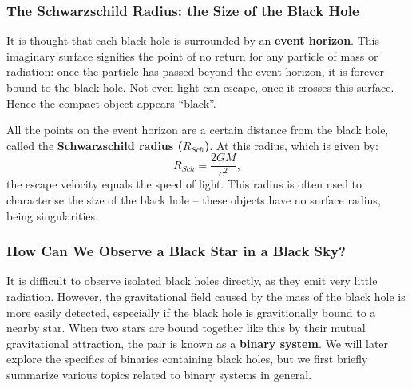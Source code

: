 
\subsubsection{The Schwarzschild Radius: the Size of the Black Hole}
\label{cha:Introduction:sec:BlackHoles:subsubsec:EventHorizon}

It is thought that each black hole is surrounded by an \textbf{event
horizon}. This imaginary surface signifies the point of no return for any particle of mass
or radiation: once the particle has passed beyond the event horizon,
it is forever bound to the black hole. Not even light can escape, once it crosses this surface. Hence the compact object appears ``black''. %

\vspace{\myparskip}

All the points on the event horizon are a certain distance from the black hole, called the
\textbf{Schwarzschild radius ($R_{Sch}$)}. %
At this radius, which is given by:
\begin{equation}
\label{cha:Introduction:sec:BlackHoles:eqn:R_Sch}
R_{Sch} = \frac{2 G M}{c^2},
\end{equation}
the escape velocity equals the speed of light. This radius is often used to characterise the size of the black hole -- these objects have no surface radius, being singularities. %


\subsubsection{How Can We Observe a Black Star in a Black Sky?}
\label{cha:Introduction:sec:BlackHoles:subsubsec:HowCanWeObserveABlackStarInABlackSky}

It is difficult to observe isolated black holes directly, as they emit
very little radiation. However, the gravitational field caused by the mass of
the black hole is more easily detected, especially if the black hole
is gravitionally bound to a nearby star. When two stars are bound
together like this by their mutual gravitational attraction, the pair is known
as a \textbf{binary system}. We will later explore the specifics of
binaries containing black holes, but we first briefly summarize various topics
related to binary systems in general. %

